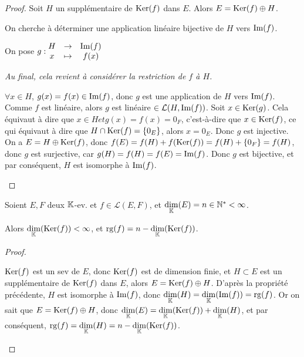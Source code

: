 \documentclass[12pt, a4paper]{report}
\begin{document}
\begin{proof}
    Soit $H$ un supplémentaire de $\mathrm{Ker}(f)$ dans $E$. Alors $E = \mathrm{Ker}(f) \oplus H$.

    On cherche à déterminer une application linéaire bijective de $H$ vers $\mathrm{Im}(f)$.

    On pose $g : \begin{matrix}
    H &\to &\mathrm{Im}(f)\\
    x &\mapsto &f(x)
    \end{matrix}$

    \textit{Au final, cela revient à considérer la restriction de $f$ à $H$.}

    \begin{outline}
        \1 $\forall x \in H$, $g(x) = f(x) \in \mathrm{Im}(f)$, donc $g$ est une application de $H$ vers $\mathrm{Im}(f)$.
        \1 Comme $f$ est linéaire, alors $g$ est linéaire $\in \mathcal L(H, \mathrm{Im}(f))$.
        \1 Soit $x \in \mathrm{Ker}(g)$. Cela équivaut à dire que $x\in H et g(x) = f(x) = 0_F$, c'est-à-dire que $x \in \mathrm{Ker}(f)$, ce qui équivaut à dire que $H \cap \mathrm{Ker}(f) = \{0_E\}$, alors $x = 0_E$. Donc $g$ est injective.
        \1 On a $E = H \oplus \mathrm{Ker}(f)$, donc $f(E) = f(H) + f(\mathrm{Ker}(f)) = f(H) + \{0_F\} = f(H)$, donc $g$ est surjective, car $g(H) = f(H) = f(E) = \mathrm{Im}(f)$.
        \1 Donc $g$ est bijective, et par conséquent, $H$ est isomorphe à $\mathrm{Im}(f)$.
    \end{outline}
\end{proof}

\begin{theorem}
    Soient $E,F$ deux $\mathbb{K}$-ev. et $f \in \mathcal L(E,F)$, et $\underset{\mathbb{K}}\dim(E) = n \in \mathbb{N}^* < \infty$.
    
    Alors $\underset{\mathbb{K}}\dim(\mathrm{Ker}(f)) < \infty$, et $\mathrm{rg}(f) = n - \underset{\mathbb{K}}\dim(\mathrm{Ker}(f))$.
\end{theorem}

\begin{proof}
    \begin{outline}
        \1 $\mathrm{Ker}(f)$ est un sev de $E$, donc $\mathrm{Ker}(f)$ est de dimension finie, et $H \subset E$ est un supplémentaire de $\mathrm{Ker}(f)$ dans $E$, alors $E = \mathrm{Ker}(f) \oplus H$.
        \1 D'après la propriété précédente, $H$ est isomorphe à $\mathrm{Im}(f)$, donc $\underset{\mathbb{K}}\dim(H) = \underset{\mathbb{K}}\dim(\mathrm{Im}(f)) = \mathrm{rg}(f)$.
        \1 Or on sait que $E = \mathrm{Ker}(f) \oplus H$, donc $\underset{\mathbb{K}}\dim(E) = \underset{\mathbb{K}}\dim(\mathrm{Ker}(f)) + \underset{\mathbb{K}}\dim(H)$, et par conséquent, $\mathrm{rg}(f) = \underset{\mathbb{K}}\dim(H) = n - \underset{\mathbb{K}}\dim(\mathrm{Ker}(f))$.
    \end{outline}
\end{proof}
\end{document}
